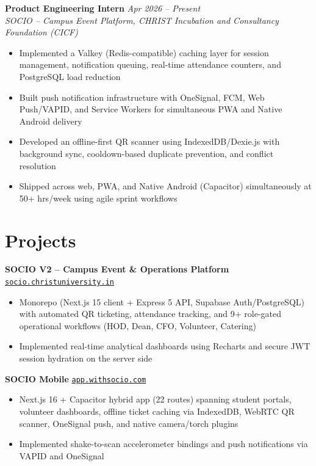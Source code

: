 \documentclass[10pt,a4paper]{article}
\newcommand{\role}[4]{%
  \noindent\textbf{#1} \hfill \textit{#3 -- #4}\\[-3pt]
  \noindent\textit{#2}\par
}
\newcommand{\project}[3]{%
  \noindent\textbf{#1} \hfill \href{#2}{\texttt{\small #3}}\par
}
\begin{document}
\role{Product Engineering Intern}{SOCIO -- Campus Event Platform, CHRIST Incubation and Consultancy Foundation (CICF)}{Apr 2026}{Present}
\vspace{1pt}
\begin{itemize}
  \item Implemented a Valkey (Redis-compatible) caching layer for session management,
        notification queuing, real-time attendance counters, and PostgreSQL load reduction
  \item Built push notification infrastructure with OneSignal, FCM, Web Push/VAPID, and
        Service Workers for simultaneous PWA and Native Android delivery
  \item Developed an offline-first QR scanner using IndexedDB/Dexie.js with background sync,
        cooldown-based duplicate prevention, and conflict resolution
  \item Shipped across web, PWA, and Native Android (Capacitor) simultaneously at
        50+ hrs/week using agile sprint workflows
\end{itemize}

\section*{Projects}

\project{SOCIO V2 -- Campus Event \& Operations Platform}{https://socio.christuniversity.in}{socio.christuniversity.in}
\begin{itemize}
  \item Monorepo (Next.js 15 client + Express 5 API, Supabase Auth/PostgreSQL) with automated QR ticketing, attendance tracking, and 9+ role-gated operational workflows (HOD, Dean, CFO, Volunteer, Catering)
  \item Implemented real-time analytical dashboards using Recharts and secure JWT session hydration on the server side
\end{itemize}

\vspace{2pt}
\project{SOCIO Mobile}{https://app.withsocio.com}{app.withsocio.com}
\begin{itemize}
  \item Next.js 16 + Capacitor hybrid app (22 routes) spanning student portals, volunteer dashboards, offline ticket caching via IndexedDB, WebRTC QR scanner, OneSignal push, and native camera/torch plugins
  \item Implemented shake-to-scan accelerometer bindings and push notifications via VAPID and OneSignal
\end{itemize}
\end{document}
